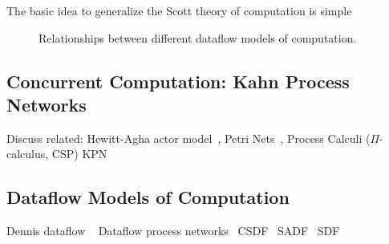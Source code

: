 The basic idea to generalize the Scott theory of computation is simple

\begin{figure}[h]
	\centering
   \resizebox{0.55\textwidth}{!}{}
	\caption{Relationships between different dataflow models of computation.}
	\label{fig:dataflow_mocs}
\end{figure}



\subsection{Concurrent Computation: Kahn Process Networks}
Discuss related: Hewitt-Agha actor model~\cite{DBLP:conf/ijcai/HewittBS73,Agha:86:Actors}, Petri Nets~\cite{petri1962nets}, Process Calculi ($\Pi$-calculus, \ac{CSP})
\ac{KPN}~\cite{kahn74}

\subsection{Dataflow Models of Computation}
Dennis dataflow ~\cite{dennis1974first,dennis1986data}
\cite{Parks:M95/105}
Dataflow process networks~\cite{lee1995dataflow,lee_matsikoudis_semantics}
\ac{CSDF}~\cite{bilsen1996cycle}
\ac{SADF}~\cite{theelen2006scenario}
\ac{SDF}~\cite{lee1987sdf}



